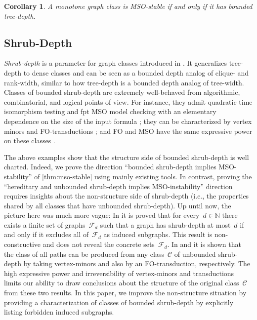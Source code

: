 \documentclass[11pt]{article}      \usepackage[margin=1in]{geometry}  \usepackage{microtype}
\newtheorem{corollary}[theorem]{Corollary}
\theoremstyle{definition}
\newcommand{\N}[0]{\mathrm{\mathbb{N}}}
\newcommand{\CC}{\mathcal{C}}
\newcommand{\FF}{\mathcal{F}}
\begin{document}
\begin{corollary}
  A monotone graph class is MSO-stable if and only if it has bounded tree-depth.
\end{corollary}



\subsection*{Shrub-Depth}
\emph{Shrub-depth} is a parameter for graph classes introduced in \cite{shrubdepth}.
It generalizes tree-depth to dense classes and can be seen as a bounded depth analog of clique- and rank-width, similar to how tree-depth is a bounded depth analog of tree-width.
Classes of bounded shrub-depth are extremely well-behaved from algorithmic, combinatorial, and logical points of view.
For instance, they admit quadratic time isomorphism testing \cite{ohlmann2023} and
fpt MSO model checking with an elementary dependence on the size of the input formula
\cite{gajarsky2015kernelizing,shrubdepth}; they can be characterized by vertex minors and FO-transductions \cite{shrubtrans}; and FO and MSO have the same expressive power on these classes \cite{gajarsky2015kernelizing}.

The above examples show that the structure side of bounded shrub-depth is well charted.
Indeed, we prove the direction ``bounded shrub-depth implies MSO-stability'' of \cref{thm:mso-stable} using mainly existing tools.
In contrast, proving the ``hereditary and unbounded shrub-depth implies MSO-instability'' direction requires insights about the non-structure side of shrub-depth (i.e., the properties shared by all classes that have unbounded shrub-depth).
Up until now, the picture here was much more vague:
In \cite{shrubdepth-journal} it is proved that for every~$d\in\N$ there exists a finite set of graphs~$\FF_d$ such that a graph has shrub-depth at most~$d$ if and only if it excludes all of~$\FF_d$ as induced subgraphs.
This result is non-constructive and does not reveal the concrete sets~$\FF_d$.
In \cite{KWON202176} and \cite{shrubtrans} it is shown that the class of all paths can be produced from any class~$\CC$ of unbounded shrub-depth by taking vertex-minors and also by an FO-transduction, respectively.
The high expressive power and irreversibility of vertex-minors and transductions limits our ability to draw conclusions about the structure of the original class~$\CC$ from these two results. 
In this paper, we improve the non-structure situation by providing a characterization of classes of bounded shrub-depth by explicitly listing forbidden induced subgraphs.
\end{document}

